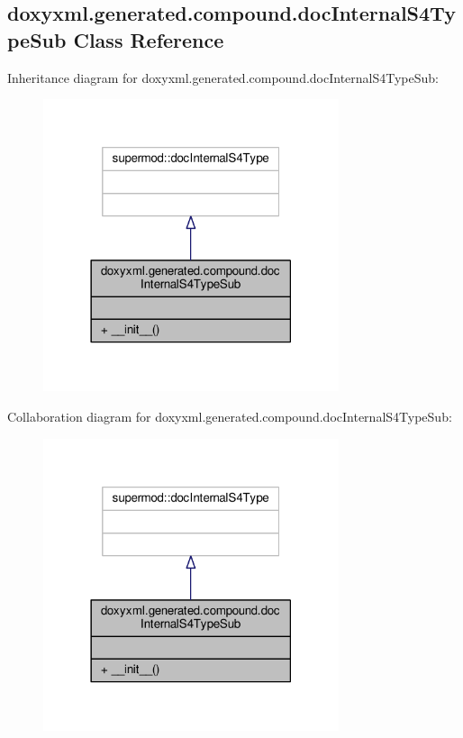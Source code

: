 \subsection{doxyxml.\+generated.\+compound.\+doc\+Internal\+S4\+Type\+Sub Class Reference}
\label{classdoxyxml_1_1generated_1_1compound_1_1docInternalS4TypeSub}


Inheritance diagram for doxyxml.\+generated.\+compound.\+doc\+Internal\+S4\+Type\+Sub\+:
\nopagebreak
\begin{figure}[H]
\begin{center}
\leavevmode
\includegraphics[width=246pt]{de/dab/classdoxyxml_1_1generated_1_1compound_1_1docInternalS4TypeSub__inherit__graph}
\end{center}
\end{figure}


Collaboration diagram for doxyxml.\+generated.\+compound.\+doc\+Internal\+S4\+Type\+Sub\+:
\nopagebreak
\begin{figure}[H]
\begin{center}
\leavevmode
\includegraphics[width=246pt]{db/db1/classdoxyxml_1_1generated_1_1compound_1_1docInternalS4TypeSub__coll__graph}
\end{center}
\end{figure}
